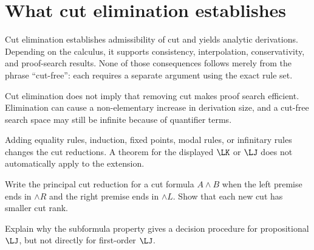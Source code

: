 \section{What cut elimination establishes}
\label{sec:cut-elimination-02}

Cut elimination establishes admissibility of cut and yields analytic
derivations.  Depending on the calculus, it supports consistency,
interpolation, conservativity, and proof-search results.  None of those
consequences follows merely from the phrase ``cut-free'': each requires a
separate argument using the exact rule set.

Cut elimination does not imply that removing cut makes proof search efficient.
Elimination can cause a non-elementary increase in derivation size, and a
cut-free search space may still be infinite because of quantifier terms.

\begin{warning}
Adding equality rules, induction, fixed points, modal rules, or infinitary rules
changes the cut reductions.  A theorem for the displayed \(\LK\) or \(\LJ\)
does not automatically apply to the extension.
\end{warning}

\begin{exercise}
\label{ex:cut-elimination-01}
Write the principal cut reduction for a cut formula \(A\land B\) when the left
premise ends in \(\land R\) and the right premise ends in \(\land L\).  Show
that each new cut has smaller cut rank.
\end{exercise}

\begin{exercise}
\label{ex:cut-elimination-02}
Explain why the subformula property gives a decision procedure for
propositional \(\LJ\), but not directly for first-order \(\LJ\).
\end{exercise}

